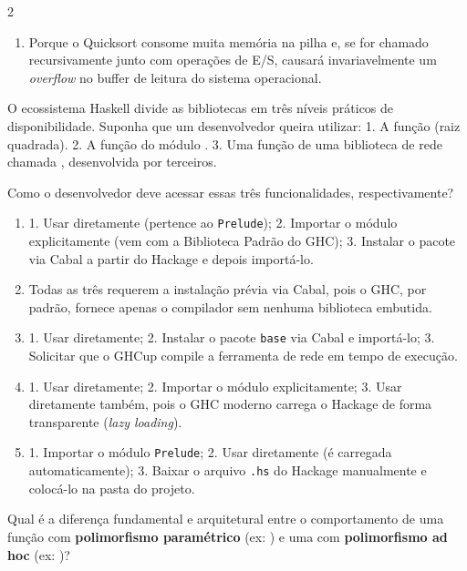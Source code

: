 \documentclass[a4paper,10pt,brazil]{article}
\begin{document}
\begin{multicols}{2}
\begin{enumerate}
  \item Porque o Quicksort consome muita memória na pilha e, se for chamado recursivamente junto com operações de E/S, causará invariavelmente um \emph{overflow} no buffer de leitura do sistema operacional.


\end{enumerate}

O ecossistema Haskell divide as bibliotecas em três níveis práticos de disponibilidade. Suponha que um desenvolvedor queira utilizar:
1. A função  (raiz quadrada).
2. A função  do módulo .
3. Uma função de uma biblioteca de rede chamada , desenvolvida por terceiros.

Como o desenvolvedor deve acessar essas três funcionalidades, respectivamente?

\begin{enumerate}
  \item 1. Usar diretamente (pertence ao \texttt{Prelude}); 2. Importar o módulo explicitamente (vem com a Biblioteca Padrão do GHC); 3. Instalar o pacote via Cabal a partir do Hackage e depois importá-lo.

  \item Todas as três requerem a instalação prévia via Cabal, pois o GHC, por padrão, fornece apenas o compilador sem nenhuma biblioteca embutida.

  \item 1. Usar diretamente; 2. Instalar o pacote \texttt{base} via Cabal e importá-lo; 3. Solicitar que o GHCup compile a ferramenta de rede em tempo de execução.

  \item 1. Usar diretamente; 2. Importar o módulo explicitamente; 3. Usar diretamente também, pois o GHC moderno carrega o Hackage de forma transparente (\emph{lazy loading}).

  \item 1. Importar o módulo \texttt{Prelude}; 2. Usar diretamente (é carregada automaticamente); 3. Baixar o arquivo \texttt{.hs} do Hackage manualmente e colocá-lo na pasta do projeto.


\end{enumerate}

Qual é a diferença fundamental e arquitetural entre o comportamento de uma função com \textbf{polimorfismo paramétrico} (ex: ) e uma com \textbf{polimorfismo ad hoc} (ex: )?


\end{multicols}
\end{document}
